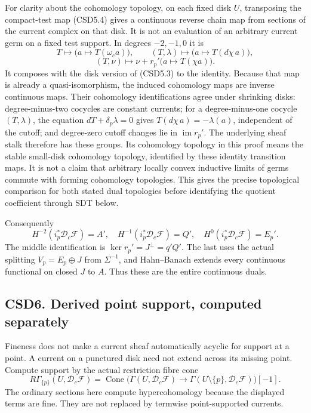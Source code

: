 For clarity about the cohomology topology, on each fixed disk \(U\),
transposing the compact-test map (CSD5.4) gives a continuous reverse
chain map from sections of the current complex on that disk. It is not
an evaluation of an arbitrary current germ on a fixed test support. In
degrees \(-2,-1,0\) it is \[
T\mapsto\bigl(a\mapsto T(\omega_c a)\bigr),\qquad
(T,\lambda)\mapsto\bigl(a\mapsto T(d\chi\,a)\bigr),
\] \[
(T,\nu)\mapsto\nu+r_p'\bigl(a\mapsto T(\chi a)\bigr).
\tag{CSD5.7}
\] It composes with the disk version of (CSD5.3) to the identity.
Because that map is already a quasi-isomorphism, the induced cohomology
maps are inverse continuous maps. Their cohomology identifications agree
under shrinking disks: degree-minus-two cocycles are constant currents;
for a degree-minus-one cocycle \((T,\lambda)\), the equation
\(dT+\delta_p\lambda=0\) gives \(T(d\chi\,a)=-\lambda(a)\), independent
of the cutoff; and degree-zero cutoff changes lie in
\(\operatorname{im}r_p'\). The underlying sheaf stalk therefore has
these groups. Its cohomology topology in this proof means the stable
small-disk cohomology topology, identified by these identity transition
maps. It is not a claim that arbitrary locally convex inductive limits
of germs commute with forming cohomology topologies. This gives the
precise topological comparison for both stated dual topologies before
identifying the quotient coefficient through SDT below.

Consequently \[
H^{-2}(i_p^*\mathscr D_c\mathscr F)=A',\quad
H^{-1}(i_p^*\mathscr D_c\mathscr F)=Q',\quad
H^0(i_p^*\mathscr D_c\mathscr F)=E_p'.
\tag{CSD5.6}
\] The middle identification is \(\ker r_p'=J^\perp=q'Q'\). The last
uses the actual splitting \(V_p=E_p\oplus J\) from \(\Sigma^{-1}\), and
Hahn--Banach extends every continuous functional on closed \(J\) to
\(A\). Thus these are the entire continuous duals.

\subsection{CSD6. Derived point support, computed
separately}\label{csd6.-derived-point-support-computed-separately}

Fineness does not make a current sheaf automatically acyclic for support
at a point. A current on a punctured disk need not extend across its
missing point. Compute support by the actual restriction fibre cone \[
R\Gamma_{\{p\}}(U,\mathscr D_c\mathscr F)
=\operatorname{Cone}\bigl(
\Gamma(U,\mathscr D_c\mathscr F)\to
\Gamma(U\setminus\{p\},\mathscr D_c\mathscr F)\bigr)[-1].
\tag{CSD6.1}
\] The ordinary sections here compute hypercohomology because the
displayed terms are fine. They are not replaced by termwise
point-supported currents.

